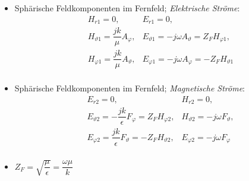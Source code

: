 {\begin{itemize}
\begin{align*}
\begin{cases}
                    \vec{H}(\vec{r}) \approx -\dfrac{jk}{\mu}\vec{e}_r\times\vec{A}(\vec{r}),\\
                    \vec{E}(\vec{r}) \approx \dfrac{jk}{\epsilon}\vec{e}_r\times\vec{F}(\vec{r})
                \end{cases}
            \end{align*}
        \item Sphärische Feldkomponenten im Fernfeld; \textit{Elektrische Ströme}:
            \begin{align*}
                &H_{r1}=0, &E_{r1}=0,\\
                &H_{\vartheta1}=\dfrac{jk}{\mu}A_{\varphi}, &E_{\vartheta1}=-j\omega A_{\vartheta}=Z_F H_{\varphi1},\\
                &H_{\varphi1}=\dfrac{jk}{\mu}A_{\vartheta}, &E_{\varphi1}=-j\omega A_{\varphi}=-Z_F H_{\vartheta1}\\
            \end{align*}
        \item Sphärische Feldkomponenten im Fernfeld; \textit{Magnetische Ströme}:
            \begin{align*}
                &E_{r2}=0, &H_{r2}=0,\\
                &E_{\vartheta2}=-\dfrac{jk}{\epsilon}F_{\varphi}=Z_F H_{\varphi2}, &H_{\vartheta2}=-j\omega F_{\vartheta},\\
                &E_{\varphi2}=\dfrac{jk}{\epsilon}F_{\vartheta}=-Z_F H_{\vartheta2}, &E_{\varphi2}=-j\omega F_{\varphi}\\
            \end{align*}
        \item \(Z_F = \sqrt{\dfrac{\mu}{\epsilon}} = \dfrac{\omega\mu}{k}\)
\end{itemize}
}
